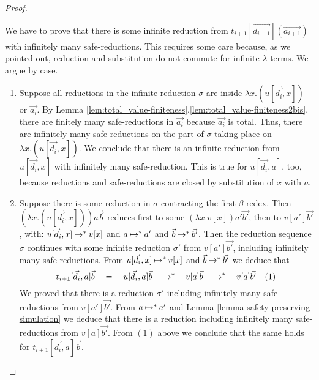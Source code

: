\begin{proof}
\begin{enumerate}
  We have to prove that there is some infinite reduction from 
  $t_{i+1}[\vec{d_{i+1}}](\vec{a_{i+1}})$ with infinitely
  many safe-reductions. This requires some care because, as we pointed out,
  reduction and substitution do not commute for infinite $\lambda$-terms.
  We argue by case.
\begin{enumerate}
\item
 Suppose all reductions in the infinite reduction $\sigma$ 
  are inside $\lambda x.(u[\vec{d_i},x])$ or $\vec{a_i}$.
 By Lemma \ref{lem:total_value-finiteness}.\ref{lem:total_value-finiteness2bis},
  there are finitely many safe-reductions in $\vec{a_i}$ because $\vec{a_i}$ is total.
 Thus, there are infinitely many safe-reductions on the part of $\sigma$
  taking place on $\lambda x.(u[\vec{d_i},x])$.
  We conclude that there is an infinite reduction from $u[\vec{d_i},x]$ 
  with infinitely many safe-reduction. This is true for $u[\vec{d_i},a]$, too, 
  because reductions and safe-reductions are closed by substitution of $x$ with $a$.
  

\item
 Suppose there is some reduction in $\sigma$ contracting the first $\beta$-redex.
 Then  $(\lambda x.(u[\vec{d_i},x]))a\vec{b}$ reduces first to some
 $ (\lambda x.v[x])a'\vec{b'}$, then to $v[a']\vec{b'}$, with: 
 $u[\vec{d_i},x] \mathbin{\mapsto}^{*} v[x]$ and 
 $a\mathbin{\mapsto}^{*} a'$ and $\vec{b} \mathbin{\mapsto}^{*} \vec{b'}$.
 Then the reduction sequence $\sigma$ continues with some infinite reduction $\sigma'$ from 
  $v[a']\vec{b'}$, including infinitely many safe-reductions. 
 From $u[\vec{d_i},x] \mathbin{\mapsto}^{*} v[x]$ and $\vec{b} \mathbin{\mapsto}^{*} \vec{b'}$ we deduce that 
 \[
 t_{i+1}[\vec{d_i},a]\vec{b}  
 \quad =\quad
 u[\vec{d_i},a]\vec{b} 
 \quad\mathbin{\mapsto}^{*}\quad
 v[a]\vec{b}
 \quad\mathbin{\mapsto}^{*}\quad
 v[a]\vec{b'} 
 \ \ \ \mbox{(1)}
 \]
 We proved that there is a reduction $\sigma'$ 
 including infinitely many safe-reductions from  $v[a']\vec{b'}$.
 From $a \mathbin{\mapsto}^{*} a'$ and Lemma \ref{lemma-safety-preserving-simulation}
 we deduce that there is a reduction including infinitely many safe-reductions from  
 $v[a]\vec{b'}$. From $(1)$ above we conclude that the same holds for
 $t_{i+1}[\vec{d_i},a]\vec{b}$.
\end{enumerate}


\end{enumerate}
\end{proof}

